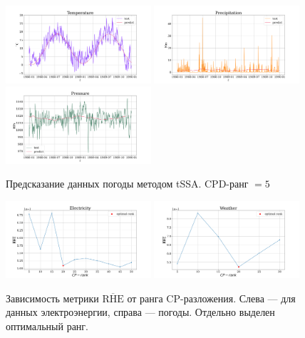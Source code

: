 	\begin{figure}[h]
		\centering
		\includegraphics[width=0.48\textwidth, keepaspectratio]{../../experiments/weather/tssa/figs/prediction/cpd_rank_5/Temperature.png}
		\includegraphics[width=0.48\textwidth, keepaspectratio]{../../experiments/weather/tssa/figs/prediction/cpd_rank_5/Precipitation.png}
		\includegraphics[width=0.48\textwidth, keepaspectratio]{../../experiments/weather/tssa/figs/prediction/cpd_rank_5/Pressure.png}
		\caption{Предсказание данных погоды методом tSSA. CPD-ранг $ = 5 $}\label{fig:tssa_weather_pred}
	\end{figure}
	
	\begin{figure}[h!]
		\centering
		\includegraphics[width=0.48\textwidth, keepaspectratio]{../../experiments/electricity/tssa/figs/decomposition/RHE_mean.png}
		\includegraphics[width=0.48\textwidth, keepaspectratio]{../../experiments/weather/tssa/figs/decomposition/RHE_mean.png}
		\caption{Зависимость метрики $ \overline{\text{RHE}} $ от ранга CP-разложения. Слева --- для данных электроэнергии, справа --- погоды. Отдельно выделен оптимальный ранг.}\label{fig:decomp_rhe_rank}
	\end{figure}
	
